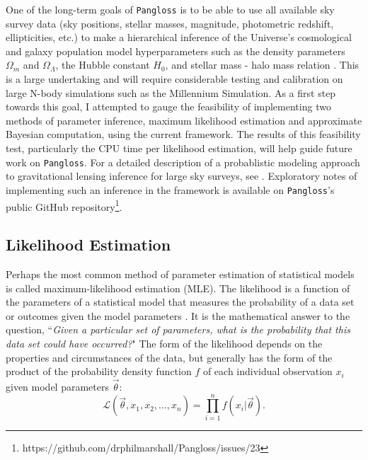 \documentclass[%
 reprint,
 amsmath,amssymb,
 aps,nofootinbib
]{revtex4-1}
\begin{document}
One of the long-term goals of \texttt{Pangloss} is to be able to use all available sky survey data (sky positions, stellar masses, magnitude, photometric redshift, ellipticities, etc.) to make a hierarchical inference of the Universe's cosmological and galaxy population model hyperparameters such as the density parameters $\Omega_m$ and $\Omega_\Lambda$, the Hubble constant $H_0$, and stellar mass - halo mass relation \cite{smhr}. This is a large undertaking and will require considerable testing and calibration on large N-body simulations such as the Millennium Simulation. As a first step towards this goal, I attempted to gauge the feasibility of implementing two methods of parameter inference, maximum likelihood estimation and approximate Bayesian computation, using the current framework. The results of this feasibility test, particularly the CPU time per likelihood estimation, will help guide future work on \texttt{Pangloss}. For a detailed description of a probablistic modeling approach to gravitational lensing inference for large sky surveys, see \cite{hierarchical_inference}. Exploratory notes of implementing such an inference in the framework is available on \texttt{Pangloss}'s public GitHub repository\footnote{https://github.com/drphilmarshall/Pangloss/issues/23}.\\


\subsection{Likelihood Estimation} \label{mle}

Perhaps the most common method of parameter estimation of statistical models is called maximum-likelihood estimation (MLE). The likelihood is a function of the parameters of a statistical model that measures the probability of a data set or outcomes given the model parameters \cite{bayes_in_sky}. It is the mathematical answer to the question, ``\textit{Given a particular set of parameters, what is the probability that this data set could have occurred?}" The form of the likelihood depends on the properties and circumstances of the data, but generally has the form of the product of the probability density function $f$ of each individual observation $x_i$ given model parameters $\vec{\theta}$:
\begin{equation}
\mathcal{L}(\vec{\theta},x_1,x_2,\ldots,x_n)=\prod_{i=1}^nf(x_i|\vec{\theta}).
\end{equation}
\end{document}
